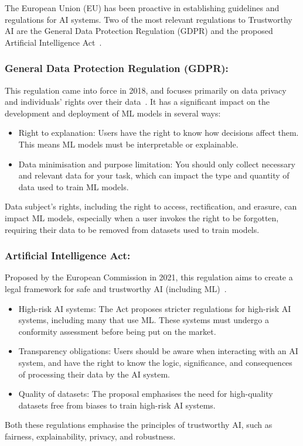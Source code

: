 \documentclass[a4paper,11pt]{article}
\begin{document}
The European Union (EU) has been proactive in establishing guidelines and regulations for AI systems.  Two of the most relevant regulations to Trustworthy AI are the General Data Protection Regulation (GDPR) and the proposed Artificial Intelligence Act~\cite{gal2020competitive, veale2021demystifying}.

\subsubsection{General Data Protection Regulation (GDPR):}
This regulation came into force in 2018, and focuses primarily on data privacy and individuals' rights over their data~\cite{sovrano2020modelling}. It has a significant impact on the development and deployment of ML models in several ways:
\begin{itemize}
\item Right to explanation: Users have the right to know how decisions affect them. This means ML models must be interpretable or explainable.
\item Data minimisation and purpose limitation: You should only collect necessary and relevant data for your task, which can impact the type and quantity of data used to train ML models.
\end{itemize}
Data subject's rights, including the right to access, rectification, and erasure, can impact ML models, especially when a user invokes the right to be forgotten, requiring their data to be removed from datasets used to train models.

\subsubsection{Artificial Intelligence Act:} Proposed by the European Commission in 2021, this regulation aims to create a legal framework for safe and trustworthy AI (including ML)~\cite{ai2019high}. 
\begin{itemize}
\item High-risk AI systems: The Act proposes stricter regulations for high-risk AI systems, including many that use ML. These systems must undergo a conformity assessment before being put on the market.
\item Transparency obligations: Users should be aware when interacting with an AI system, and have the right to know the logic, significance, and consequences of processing their data by the AI system.
\item Quality of datasets: The proposal emphasises the need for high-quality datasets free from biases to train high-risk AI systems.
\end{itemize}
Both these regulations emphasise the principles of trustworthy AI, such as fairness, explainability, privacy, and robustness. 

%

\end{document}
